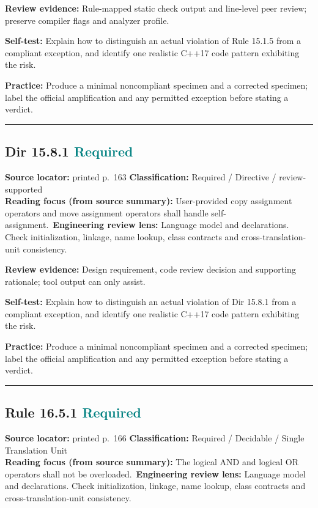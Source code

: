 \documentclass[10pt,letterpaper]{article}
\begin{document}
\textbf{Review evidence:} Rule-mapped static check output and line-level peer review; preserve compiler flags and analyzer profile.

\textbf{Self-test:} Explain how to distinguish an actual violation of Rule 15.1.5 from a compliant exception, and identify one realistic C++17 code pattern exhibiting the risk.\par
\textbf{Practice:} Produce a minimal noncompliant specimen and a corrected specimen; label the official amplification and any permitted exception before stating a verdict.
\smallskip\hrule\smallskip
\subsection*{Dir 15.8.1 \enspace \texorpdfstring{\small\textcolor{teal}{Required}}{Required}}
\noindent\textbf{Source locator:} printed p.~163 \quad\textbf{Classification:} Required / Directive / review-supported\\
\textbf{Reading focus (from source summary):} User-provided copy assignment operators and move assignment operators shall handle self-assignment.\
\textbf{Engineering review lens:} Language model and declarations. Check initialization, linkage, name lookup, class contracts and cross-translation-unit consistency.

\textbf{Review evidence:} Design requirement, code review decision and supporting rationale; tool output can only assist.

\textbf{Self-test:} Explain how to distinguish an actual violation of Dir 15.8.1 from a compliant exception, and identify one realistic C++17 code pattern exhibiting the risk.\par
\textbf{Practice:} Produce a minimal noncompliant specimen and a corrected specimen; label the official amplification and any permitted exception before stating a verdict.
\smallskip\hrule\smallskip
\subsection*{Rule 16.5.1 \enspace \texorpdfstring{\small\textcolor{teal}{Required}}{Required}}
\noindent\textbf{Source locator:} printed p.~166 \quad\textbf{Classification:} Required / Decidable / Single Translation Unit\\
\textbf{Reading focus (from source summary):} The logical AND and logical OR operators shall not be overloaded.\
\textbf{Engineering review lens:} Language model and declarations. Check initialization, linkage, name lookup, class contracts and cross-translation-unit consistency.
\end{document}
